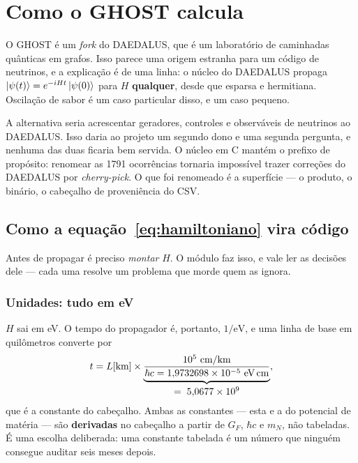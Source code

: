 \chapter{Como o GHOST calcula}
\label{cap:nucleo}

O GHOST é um \emph{fork} do DAEDALUS, que é um laboratório de caminhadas
quânticas em grafos. Isso parece uma origem estranha para um código de
neutrinos, e a explicação é de uma linha: o núcleo do DAEDALUS propaga
$\left|\psi(t)\right\rangle = e^{-iHt}\left|\psi(0)\right\rangle$ para $H$ \textbf{qualquer}, desde que
esparsa e hermitiana. Oscilação de sabor é um caso particular disso, e um caso
pequeno.

\begin{nota}
A alternativa seria acrescentar geradores, controles e observáveis de neutrinos
ao DAEDALUS. Isso daria ao projeto um segundo dono e uma segunda pergunta, e
nenhuma das duas ficaria bem servida. O núcleo em C mantém o prefixo
 de propósito: renomear as 1791 ocorrências tornaria impossível
trazer correções do DAEDALUS por \emph{cherry-pick}. O que foi renomeado é a
superfície --- o produto, o binário, o cabeçalho de proveniência do CSV.
\end{nota}

\section{Como a equação~\eqref{eq:hamiltoniano} vira código}

Antes de propagar é preciso \emph{montar} $H$. O módulo 
faz isso, e vale ler as decisões dele --- cada uma resolve um problema que
morde quem as ignora.

\subsection{Unidades: tudo em eV}

$H$ sai em eV. O tempo do propagador é, portanto, $1/\text{eV}$, e uma linha de
base em quilômetros converte por
\begin{equation}
  t = L[\text{km}] \times \underbrace{\frac{10^{5}\ \text{cm/km}}
      {\hbar c = 1{,}9732698\times10^{-5}\ \text{eV\,cm}}}
      _{\textstyle = \; 5{,}0677\times10^{9}},
\end{equation}
que é a constante  do cabeçalho.
Ambas as constantes --- esta e a do potencial de matéria --- são
\textbf{derivadas} no cabeçalho a partir de $G_F$, $\hbar c$ e $m_N$, não
tabeladas. É uma escolha deliberada: uma constante tabelada é um número que
ninguém consegue auditar seis meses depois.

